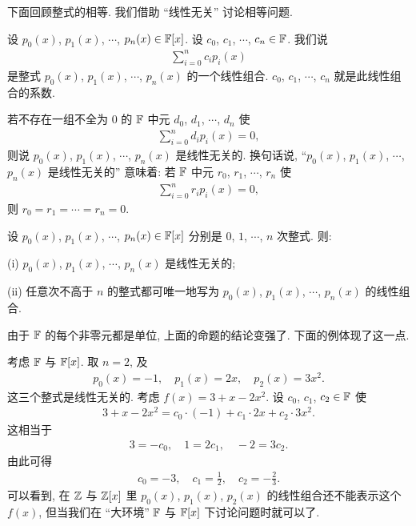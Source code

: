 下面回顾整式的相等. 我们借助 ``线性无关'' 讨论相等问题.

\begin{definition}
    设 $p_0 (x)$, $p_1 (x)$, $\cdots$, $p_n (x) \in \mathbb{F}[x]$. 设 $c_0$, $c_1$, $\cdots$, $c_n \in \mathbb{F}$. 我们说
    \begin{align*}
        \sum_{i = 0}^{n} c_i p_i (x)
    \end{align*}
    是整式 $p_0 (x)$, $p_1 (x)$, $\cdots$, $p_n (x)$ 的一个线性组合. $c_0$, $c_1$, $\cdots$, $c_n$ 就是此线性组合的系数.

    若不存在一组不全为 $0$ 的 $\mathbb{F}$ 中元 $d_0$, $d_1$, $\cdots$, $d_n$ 使
    \begin{align*}
        \sum_{i = 0}^{n} d_i p_i (x) = 0,
    \end{align*}
    则说 $p_0 (x)$, $p_1 (x)$, $\cdots$, $p_n (x)$ 是线性无关的. 换句话说, ``$p_0 (x)$, $p_1 (x)$, $\cdots$, $p_n (x)$ 是线性无关的'' 意味着: 若 $\mathbb{F}$ 中元 $r_0$, $r_1$, $\cdots$, $r_n$ 使
    \begin{align*}
        \sum_{i = 0}^{n} r_i p_i (x) = 0,
    \end{align*}
    则 $r_0 = r_1 = \cdots = r_n = 0$.
\end{definition}

\begin{proposition}
    设 $p_0 (x)$, $p_1 (x)$, $\cdots$, $p_n (x) \in \mathbb{F}[x]$ 分别是 $0$, $1$, $\cdots$, $n$ 次整式. 则:

    (i) $p_0 (x)$, $p_1 (x)$, $\cdots$, $p_n (x)$ 是线性无关的;

    (ii) 任意次不高于 $n$ 的整式都可唯一地写为 $p_0 (x)$, $p_1 (x)$, $\cdots$, $p_n (x)$ 的线性组合.
\end{proposition}

由于 $\mathbb{F}$ 的每个非零元都是单位, 上面的命题的结论变强了. 下面的例体现了这一点.

\begin{example}
    考虑 $\mathbb{F}$ 与 $\mathbb{F}[x]$. 取 $n=2$, 及
    \begin{align*}
        p_0 (x) = -1, \quad p_1 (x) = 2x, \quad p_2 (x) = 3x^2.
    \end{align*}
    这三个整式是线性无关的. 考虑 $f(x) = 3 + x - 2x^2$. 设 $c_0$, $c_1$, $c_2 \in \mathbb{F}$ 使
    \begin{align*}
        3 + x - 2x^2 = c_0 \cdot (-1) + c_1 \cdot 2x + c_2 \cdot 3x^2.
    \end{align*}
    这相当于
    \begin{align*}
        3 = -c_0, \quad 1 = 2c_1, \quad -2 = 3c_2.
    \end{align*}
    由此可得
    \begin{align*}
        c_0 = -3, \quad c_1 = \frac12, \quad c_2 = -\frac23.
    \end{align*}
    可以看到, 在 $\mathbb{Z}$ 与 $\mathbb{Z}[x]$ 里 $p_0 (x)$, $p_1 (x)$, $p_2 (x)$ 的线性组合还不能表示这个 $f(x)$, 但当我们在 ``大环境'' $\mathbb{F}$ 与 $\mathbb{F}[x]$ 下讨论问题时就可以了.
\end{example}

